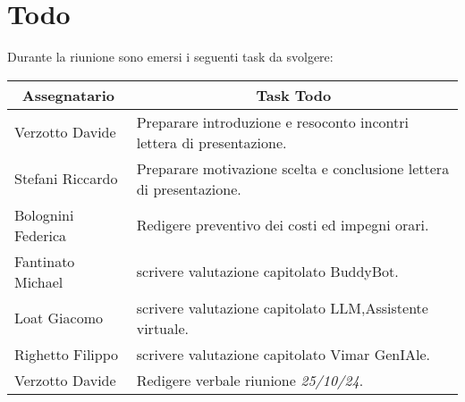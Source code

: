 \section{Todo}

Durante la riunione sono emersi i seguenti task da svolgere:

\vspace{0.5cm}

\begin{table}[htbp]
\begin{tabular}{|p{}|p{}|}
    \hline
    \multicolumn{1}{|c|}{\textbf{Assegnatario}} & \multicolumn{1}{|c|}{\textbf{Task Todo}} \\
    \hline
    Verzotto Davide & Preparare introduzione e resoconto incontri lettera di presentazione. \\
    \hline
    Stefani Riccardo & Preparare motivazione scelta e conclusione lettera di presentazione. \\
    \hline
    Bolognini Federica & Redigere preventivo dei costi ed impegni orari. \\
    \hline
    Fantinato Michael & scrivere valutazione capitolato BuddyBot. \\
    \hline
    Loat Giacomo & scrivere valutazione capitolato LLM,Assistente virtuale. \\
    \hline
    Righetto Filippo & scrivere valutazione capitolato  Vimar GenIAle. \\
    \hline 
    Verzotto Davide & Redigere verbale riunione \emph{25/10/24}. \\
    \hline
\end{tabular}
\end{table}